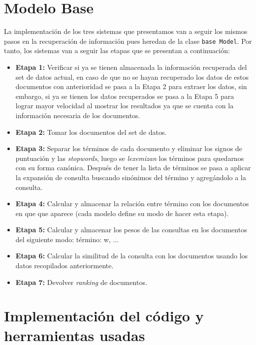 \documentclass[spanish]{article}
\begin{document}
	\section*{Modelo Base}
		La implementación de los tres sistemas que presentamos van a seguir los mismos pasos en la recuperación de información pues heredan de la clase \texttt{base Model}. Por tanto, los sistemas van a seguir las etapas que se presentan a continuación:

			\begin{itemize}
				\item \textbf{Etapa 1:} Verificar si ya se tienen almacenada la información recuperada del set de datos actual, en caso de que no se hayan recuperado los datos de estos documentos con anterioridad se pasa a la Etapa 2 para extraer los datos, sin embargo, si ya se tienen los datos recuperados se pasa a la Etapa 5 para lograr mayor velocidad al mostrar los resultados ya que se cuenta con la información necesaria de los documentos.

				\item \textbf{Etapa 2:} Tomar los documentos del set de datos.

				\item \textbf{Etapa 3:}  Separar los términos de cada documento y eliminar los signos de puntuación y las \emph{stopwords}, luego se \emph{lexemizan} los términos para quedarnos con su forma canónica. Después de tener la lista de términos se pasa a aplicar la expansión de consulta buscando sinónimos del término y agregándolo a la consulta.

				\item \textbf{Etapa 4:} Calcular y almacenar la relación entre término con los documentos en que que aparece (cada modelo define su modo de hacer esta etapa).

				\item \textbf{Etapa 5:} Calcular y almacenar los pesos de las consultas en los documentos del siguiente modo: {término: w, ...}

				\item \textbf{Etapa 6:} Calcular la similitud de la consulta con los documentos usando los datos recopilados anteriormente.

				\item \textbf{Etapa 7:} Devolver \emph{ranking} de documentos.

			\end{itemize}

	\section*{Implementación del código y herramientas usadas}
		
\end{document}
